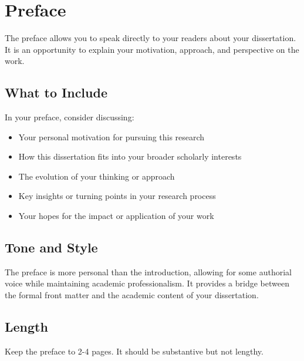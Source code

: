 \chapter*{Preface}

The preface allows you to speak directly to your readers about your dissertation. It is an opportunity to explain your motivation, approach, and perspective on the work.

\section*{What to Include}

In your preface, consider discussing:
\begin{itemize}
\item Your personal motivation for pursuing this research
\item How this dissertation fits into your broader scholarly interests
\item The evolution of your thinking or approach
\item Key insights or turning points in your research process
\item Your hopes for the impact or application of your work
\end{itemize}

\section*{Tone and Style}

The preface is more personal than the introduction, allowing for some authorial voice while maintaining academic professionalism. It provides a bridge between the formal front matter and the academic content of your dissertation.

\section*{Length}

Keep the preface to 2-4 pages. It should be substantive but not lengthy.

\newpage
